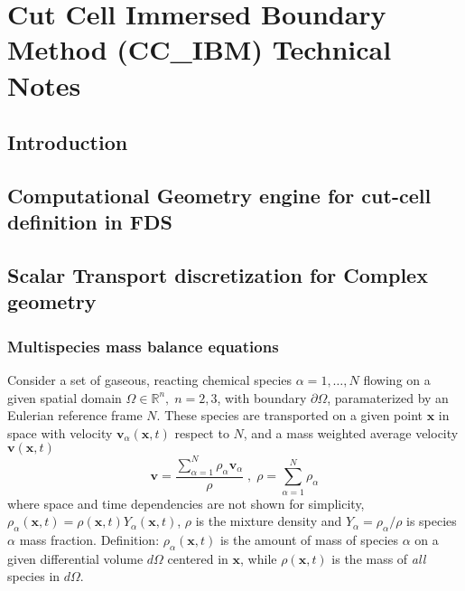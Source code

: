 






\chapter{Cut Cell Immersed Boundary Method (CC\_IBM) Technical Notes}


\section{Introduction}


\section{Computational Geometry engine for cut-cell definition in FDS}



\section{Scalar Transport discretization for Complex geometry}


\subsection{Multispecies mass balance equations}

Consider a set of gaseous, reacting  chemical species $\alpha=1,\dots,N$ flowing on a given spatial domain $\Omega \in \mathbb{R}^n, \; n=2,3$, with boundary $\partial \Omega$, paramaterized by an Eulerian reference frame $N$. These species are transported on a given point $\mathbf{x}$ in space with velocity $\mathbf{v}_\alpha(\mathbf{x},t)$ respect to $N$, and a mass weighted average velocity $\mathbf{v}(\mathbf{x},t)$
%
\begin{equation}
  \mathbf{v} = \frac{ \sum\limits_{\alpha=1}^{N} {\rho_\alpha \mathbf{v}_\alpha}}{\rho} \; , \; \rho =  \sum\limits_{\alpha=1}^{N} {\rho_\alpha} \label{eq:veldens}
\end{equation}
%
where space and time dependencies are not shown for simplicity, $\rho_\alpha(\mathbf{x},t) = \rho(\mathbf{x},t) Y_\alpha (\mathbf{x},t)$, $\rho$ is the mixture density and $Y_\alpha = \rho_\alpha / \rho$ is species $\alpha$ mass fraction. Definition: $\rho_\alpha(\mathbf{x},t)$ is the amount of mass of species $\alpha$ on a given differential volume $d\Omega$ centered in $\mathbf{x}$, while  $\rho(\mathbf{x},t)$ is the mass of \textit{all} species in $d\Omega$.

